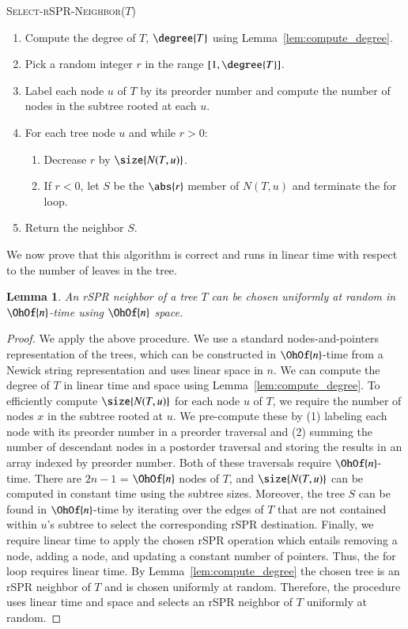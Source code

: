 \documentclass[]{elsarticle}
\newtheorem{lem}[thm]{Lemma}
\begin{document}
\vspace{1em}
\textsc{Select-rSPR-Neighbor($T$)}
\begin{enumerate}[label={\arabic*}.]
	\item	Compute the degree of $T$, $\degree{T}$ using Lemma~\ref{lem:compute_degree}.
	\item Pick a random integer $r$ in the range $[1,\degree{T}]$.
	\item Label each node $u$ of $T$ by its preorder number and compute the number of nodes in the subtree rooted at each $u$.
\item For each tree node $u$ and while $r > 0$:
	\begin{enumerate}
		\item Decrease $r$ by $\size{N(T,u)}$.
		\item If $r < 0$, let $S$ be the $\abs{r}$ member of $N(T,u)$ and terminate the for loop.
	\end{enumerate}
\item Return the neighbor $S$.
\end{enumerate}

We now prove that this algorithm is correct and runs in linear time with respect to the number of leaves in the tree.

\begin{lem}
	\label{lem:select_random_neighbor}
	An rSPR neighbor of a tree $T$ can be chosen uniformly at random in $\OhOf{n}$-time using $\OhOf{n}$ space.
\end{lem}
\begin{proof}
	We apply the above procedure.
	We use a standard nodes-and-pointers representation of the trees, which can be constructed in $\OhOf{n}$-time from a Newick string representation and uses linear space in $n$.
	We can compute the degree of $T$ in linear time and space using Lemma~\ref{lem:compute_degree}.
	To efficiently compute $\size{N(T,u)}$ for each node $u$ of $T$, we require the number of nodes $x$ in the subtree rooted at $u$.
	We pre-compute these by (1) labeling each node with its preorder number in a preorder traversal and (2) summing the number of descendant nodes in a postorder traversal and storing the results in an array indexed by preorder number.
	Both of these traversals require $\OhOf{n}$-time.
	There are $2n-1$ = $\OhOf{n}$ nodes of $T$, and $\size{N(T,u)}$ can be computed in constant time using the subtree sizes.
	Moreover, the tree $S$ can be found in $\OhOf{n}$-time by iterating over the edges of $T$ that are not contained within $u$'s subtree to select the corresponding rSPR destination.
	Finally, we require linear time to apply the chosen rSPR operation which entails removing a node, adding a node, and updating a constant number of pointers.
	Thus, the for loop requires linear time.
	By Lemma~\ref{lem:compute_degree} the chosen tree is an rSPR neighbor of $T$ and is chosen uniformly at random.
	Therefore, the procedure uses linear time and space and selects an rSPR neighbor of $T$ uniformly at random.
\end{proof}
\end{document}
